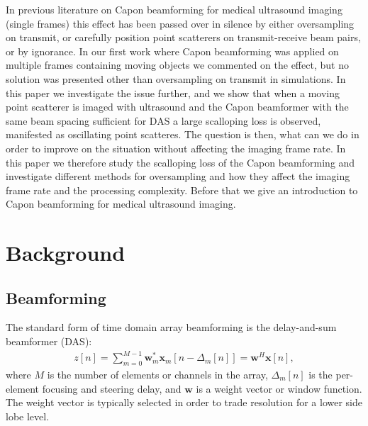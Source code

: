 \documentclass[journal]{IEEEtran}
\renewcommand{\vec}[1]{\mathbf{#1}}
\newcommand\comment[1]{\textit{{\color{red}(#1)}}}
\begin{document}
In previous literature on Capon beamforming for medical ultrasound imaging (single frames) this effect has been passed over in silence by either oversampling on transmit, or carefully position point scatterers on transmit-receive beam pairs, or by ignorance. In our first work where Capon beamforming was applied on multiple frames containing moving objects \cite{Asen} we commented on the effect, but no solution was presented other than oversampling on transmit in simulations. In this paper we investigate the issue further, and we show that when a moving point scatterer is imaged with ultrasound and the Capon beamformer with the same beam spacing sufficient for DAS a large scalloping loss is observed, manifested as oscillating point scatteres. The question is then, what can we do in order to improve on the situation without affecting the imaging frame rate. In this paper we therefore study the scalloping loss of the Capon beamforming and investigate different methods for oversampling and how they affect the imaging frame rate and the processing complexity. Before that we give an introduction to Capon beamforming for medical ultrasound imaging.  



\section{Background}
\subsection{Beamforming}
The standard form of time domain array beamforming is the delay-and-sum beamformer (DAS):
\begin{align}\label{eq:das}
z[n] = \sum_{m = 0}^{M-1}\vec{w}_m^*\vec{x}_m[n - \Delta_m[n]] = \vec{w}^H\vec{x}[n],
\end{align}
where $M$ is the number of elements or channels in the array, $\Delta_m[n]$ is the per-element focusing and steering delay, and $\vec{w}$ is a weight vector or window function. The weight vector is typically selected in order to trade resolution for a lower side lobe level.
\end{document}
